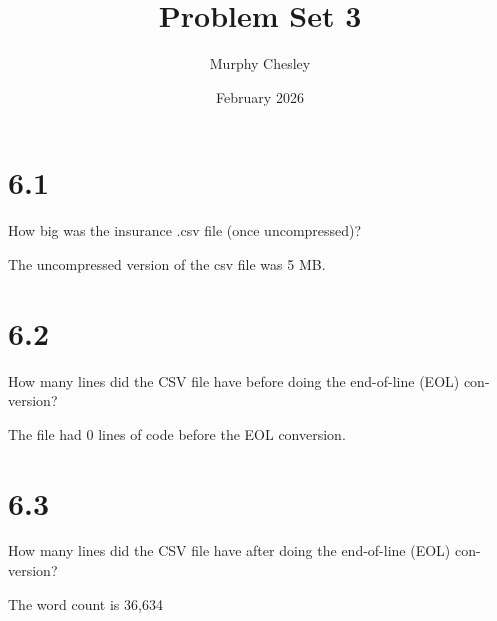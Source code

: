 \documentclass{article}
\title{Problem Set 3}
\author{Murphy Chesley}
\date{February 2026}
\begin{document}
\maketitle

\section{6.1}

How big was the insurance .csv file (once uncompressed)? 

The uncompressed version of the csv file was 5 MB.

\section{6.2}

How many lines did the CSV file have before doing the end-of-line (EOL) con-
version?

The file had 0 lines of code before the EOL conversion.

\section{6.3}

How many lines did the CSV file have after doing the end-of-line (EOL) con-
version?

The word count is 36,634
\end{document}
